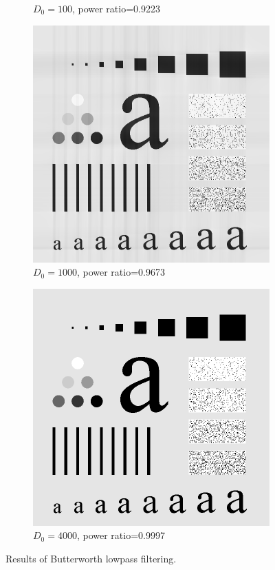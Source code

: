 \begin{figure}[h!]
\begin{subfigure}[b]{0.45\linewidth}
		\caption{$D_0=100$, power ratio=0.9223}
		\label{fig:BLPF_100}
	\end{subfigure}
	\begin{subfigure}[b]{0.45\linewidth}
		\includegraphics[width=\linewidth]{myfigure/p3/BLPF_1000.png}
		\caption{$D_0=1000$, power ratio=0.9673}
		\label{fig:BLPF_1000}
	\end{subfigure}
  	\begin{subfigure}[b]{0.45\linewidth}
		\includegraphics[width=\linewidth]{myfigure/p3/BLPF_4000.png}
		\caption{$D_0=4000$, power ratio=0.9997}
		\label{fig:BLPF_4000}
	\end{subfigure}
  	\caption{Results of Butterworth lowpass filtering.}
  	\label{fig:BLPF}
\end{figure}


